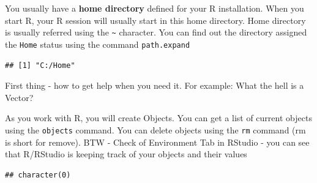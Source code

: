 \documentclass[11pt, letterpaper, twoside]{memoir}\usepackage{knitr}
\begin{document}
You usually have a \textbf{home directory} defined for your R installation. When you start R, your R session will usually start in this home directory. Home directory is usually referred using the \verb|~| character. You can find out the directory assigned the \texttt{Home} status using the command \texttt{path.expand}
\begin{knitrout}
\color{fgcolor}\begin{kframe}
\begin{alltt}
\hlstd{(}\hlstd{)}
\end{alltt}
\begin{verbatim}
## [1] "C:/Home"
\end{verbatim}
\end{kframe}
\end{knitrout}

First thing - how to get help when you need it. For example: What the hell is a Vector?
\begin{knitrout}
\color{fgcolor}\begin{kframe}
\begin{alltt}
\hlstd{(}\hlstd{)} 
 
\hlstd{(}\hlstd{)} 
\end{alltt}
\end{kframe}
\end{knitrout}

As you work with R, you will create Objects. You can get a list of current objects using the \texttt{objects} command. You can delete objects using the \texttt{rm} command (rm is short for remove). BTW - Check of Environment Tab in RStudio - you can see that R/RStudio is keeping track of your objects and their values

\begin{knitrout}
\color{fgcolor}\begin{kframe}
\begin{alltt}
\hlstd{()}
\end{alltt}
\begin{verbatim}
## character(0)
\end{verbatim}
\begin{alltt}
\hlstd{(} \hlstd{=} \hlstd{())}  
\end{alltt}
\end{kframe}
\end{knitrout}
\end{document}
